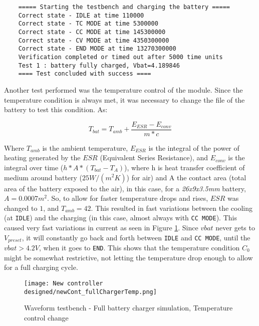 \documentclass[12pt]{article}
\begin{document}
\begin{tcolorbox}[title=New Controller Self-testable Charger Testbench Output Log, colback=gray!5, colframe=black]
    \small
    \begin{verbatim}
    ===== Starting the testbench and charging the battery =====
    Correct state - IDLE at time 110000
    Correct state - TC MODE at time 5300000
    Correct state - CC MODE at time 145300000
    Correct state - CV MODE at time 4350300000
    Correct state - END MODE at time 13270300000
    Verification completed or timed out after 5000 time units
    Test 1 : battery fully charged, Vbat=4.189846
    ==== Test concluded with success ====
    \end{verbatim}
\end{tcolorbox}
\listoffigures

Another test performed was the temperature control of the module. Since the temperature condition is always met, it was necessary to change the file of the battery to test this condition. As:

\begin{equation}
    T_{bat}=T_{amb}+\frac{E_{ESR}-E_{conv}}{m*c}
\end{equation}

Where $T_{amb}$ is the ambient temperature, $E_{ESR}$ is the integral of the power of heating generated by the $ESR$ (Equivalent Series Resistance), and $E_{conv}$ is the integral over time ($h*A*(T_{bat} - T_A) $), where h is heat transfer coefficient of medium around battery ($25 W/(m^2   K)$) for air) and A the contact area (total area of the battery exposed to the air), in this case, for a \textit{26x9x3.5mm} battery, $A = 0.0007 m^2$. So, to allow for faster temperature drops and rises, $ESR$ was changed to $1$, and $T_{amb}=42$. This resulted in fast variations between the cooling (at \texttt{IDLE}) and the charging (in this case, almost always with \texttt{CC MODE}). This caused very fast variations in current as seen in Figure \ref{fig:full_battery_waveformTemp}. Since $vbat$ never gets to $V_{preset}$, it will constantly go back and forth between \texttt{IDLE} and \texttt{CC MODE}, until the $vbat>4.2V$, when it goes to \texttt{END}. This shows that the temperature condition $C_0$ might be somewhat restrictive, not letting the temperature drop enough to allow for a full charging cycle.

\begin{figure}[H]
    \centering
    \texttt{[image: New controller designed/newCont\_fullChargerTemp.png]}
    \caption{Waveform testbench - Full battery charger simulation, Temperature control change}
    \label{fig:full_battery_waveformTemp}
\end{figure}
\end{document}

